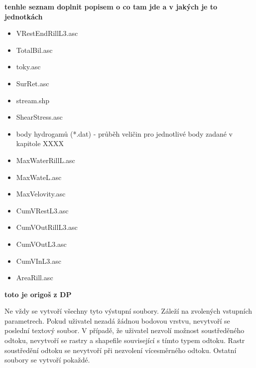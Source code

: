 \textbf{tenhle seznam doplnit popisem o co tam jde a v jakých je to jednotkách}
\begin{itemize}
\item VRestEndRillL3.asc
\item TotalBil.asc
\item toky.asc
\item SurRet.asc
\item stream.shp
\item ShearStress.asc
\item body hydrogamů (*.dat) - průběh veličin pro jednotlivé body zadané v kapitole XXXX
\item MaxWaterRillL.asc
\item MaxWateL.asc
\item MaxVelovity.asc
\item CumVRestL3.asc
\item CumVOutRillL3.asc
\item CumVOutL3.asc
\item CumVInL3.asc
\item AreaRill.asc
\end{itemize}

\textbf{toto je origoš z DP}

\par Ne vždy se vytvoří všechny tyto výstupní soubory. Záleží na zvolených vstupních parametrech. Pokud uživatel nezadá žádnou bodovou vrstvu, nevytvoří se poslední textový soubor. 
V případě, že uživatel nezvolí možnost soustředěného odtoku, nevytvoří se rastry a shapefile související s tímto typem odtoku. Rastr soustředění odtoku se nevytvoří při nezvolení vícesměrného odtoku. 
Ostatní soubory se vytvoří pokaždé.  

